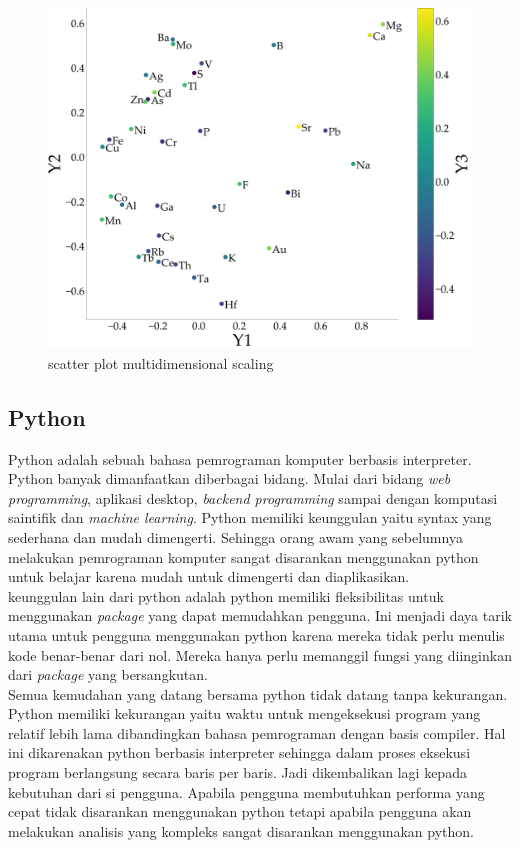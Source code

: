       \begin{figure}[H]
        \centering
          \includegraphics[scale=0.25]{gambar/MD}
          \caption{scatter plot multidimensional scaling}
          \label{md}
      \end{figure}


  \subsection{Python}
    \indent Python adalah sebuah bahasa pemrograman komputer berbasis interpreter. Python banyak dimanfaatkan diberbagai bidang. Mulai dari bidang \emph{web programming}, aplikasi desktop, \emph{backend programming} sampai dengan komputasi saintifik dan \emph{machine learning}. Python memiliki keunggulan yaitu syntax yang sederhana dan mudah dimengerti. Sehingga orang awam yang sebelumnya melakukan pemrograman komputer sangat disarankan menggunakan python untuk belajar karena mudah untuk dimengerti dan diaplikasikan.\\
    \indent keunggulan lain dari python adalah python memiliki fleksibilitas untuk menggunakan \emph{package} yang dapat memudahkan pengguna. Ini menjadi daya tarik utama untuk pengguna menggunakan python karena mereka tidak perlu menulis kode benar-benar dari nol. Mereka hanya perlu memanggil fungsi yang diinginkan dari \emph{package} yang bersangkutan.\\
    \indent Semua kemudahan yang datang bersama python tidak datang tanpa kekurangan. Python memiliki kekurangan yaitu waktu untuk mengeksekusi program yang relatif lebih lama dibandingkan bahasa pemrograman dengan basis compiler. Hal ini dikarenakan python berbasis interpreter sehingga dalam proses eksekusi program berlangsung secara baris per baris. Jadi dikembalikan lagi kepada kebutuhan dari si pengguna. Apabila pengguna membutuhkan performa yang cepat tidak disarankan menggunakan python tetapi apabila pengguna akan melakukan analisis yang kompleks sangat disarankan menggunakan python. \\
    
